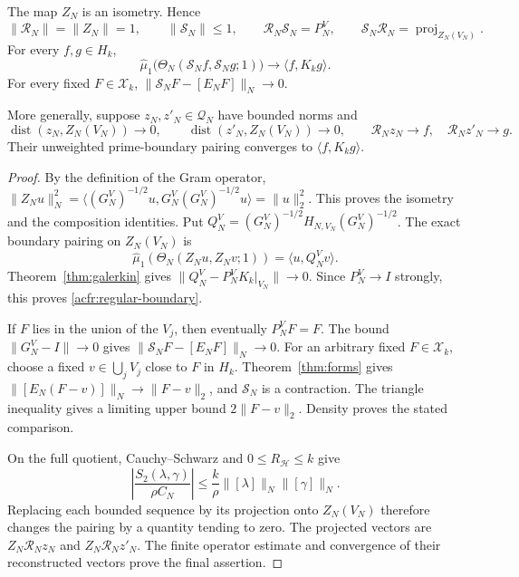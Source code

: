 \begin{theorem}
\label{acfr:regular-completion}
The map $Z_N$ is an isometry.  Hence
\[
 \|\mathscr R_N\|=\|Z_N\|=1,\qquad
 \|\mathscr S_N\|\leq1,\qquad
 \mathscr R_N\mathscr S_N=P_N^V,\qquad
 \mathscr S_N\mathscr R_N=\operatorname{proj}_{Z_N(V_N)}.
\]
For every $f,g\in H_k$,
\begin{equation}\label{acfr:regular-boundary}
 \widehat\mu_1\bigl(\Theta_N(\mathscr S_Nf,\mathscr S_Ng;1)\bigr)
       \longrightarrow\langle f,K_kg\rangle.
\end{equation}
For every fixed $F\in\mathcal X_k$,
$\|\mathscr S_NF-[E_NF]\|_N\to0$.

More generally, suppose $z_N,z'_N\in\mathcal Q_N$ have bounded norms and
\[
 \operatorname{dist}(z_N,Z_N(V_N))\to0,\qquad
 \operatorname{dist}(z'_N,Z_N(V_N))\to0,\qquad
 \mathscr R_Nz_N\to f,\quad\mathscr R_Nz'_N\to g.
\]
Their unweighted prime-boundary pairing converges to $\langle f,K_kg\rangle$.
\end{theorem}

\begin{proof}
By the definition of the Gram operator,
$\|Z_Nu\|_N^2=\langle (G_N^V)^{-1/2}u,G_N^V(G_N^V)^{-1/2}u\rangle
=\|u\|_2^2$.
This proves the isometry and the composition identities.
Put $Q_N^V=(G_N^V)^{-1/2}H_{N,V_N}(G_N^V)^{-1/2}$.
The exact boundary pairing on $Z_N(V_N)$ is
\[
 \widehat\mu_1(\Theta_N(Z_Nu,Z_Nv;1))=\langle u,Q_N^Vv\rangle.
\]
Theorem~\ref{thm:galerkin} gives
$\|Q_N^V-P_N^VK_k|_{V_N}\|\to0$.
Since $P_N^V\to I$ strongly, this proves \eqref{acfr:regular-boundary}.

If $F$ lies in the union of the $V_j$, then eventually $P_N^VF=F$.
The bound $\|G_N^V-I\|\to0$ gives
$\|\mathscr S_NF-[E_NF]\|_N\to0$.
For an arbitrary fixed $F\in\mathcal X_k$, choose a fixed
$v\in\bigcup_jV_j$ close to $F$ in $H_k$.
Theorem~\ref{thm:forms} gives
$\|[E_N(F-v)]\|_N\to\|F-v\|_2$, and $\mathscr S_N$ is a contraction.
The triangle inequality gives a limiting upper bound $2\|F-v\|_2$.
Density proves the stated comparison.

On the full quotient, Cauchy--Schwarz and $0\leq R_{\mathcal H}\leq k$ give
\begin{equation}\label{acfr:full-bound}
 \left|\frac{S_2(\lambda,\gamma)}{\rho C_N}\right|
       \leq\frac k\rho\|[\lambda]\|_N\|[\gamma]\|_N.
\end{equation}
Replacing each bounded sequence by its projection onto $Z_N(V_N)$
therefore changes the pairing by a quantity tending to zero.
The projected vectors are $Z_N\mathscr R_Nz_N$ and
$Z_N\mathscr R_Nz'_N$.
The finite operator estimate and convergence of their reconstructed vectors
prove the final assertion.
\end{proof}

